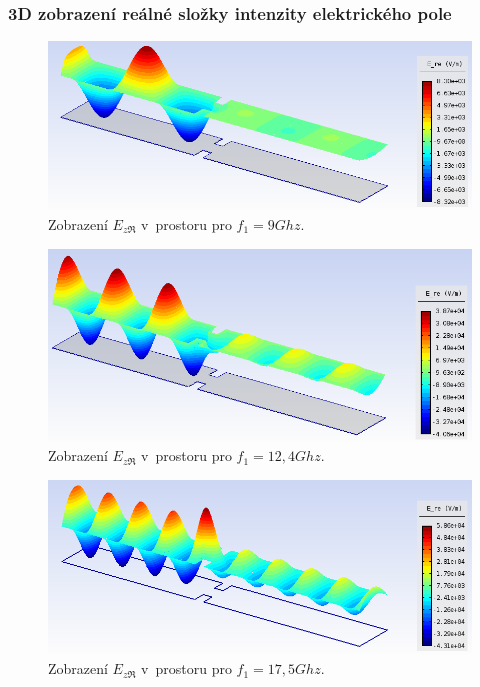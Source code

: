 \subsubsection*{3D zobrazení reálné složky intenzity elektrického pole}
\begin{figure}[!h]
	\centering
	\includegraphics[width=14cm]{priklad_R100narrow_Ere_9Ghz_3D.png}
	\caption{Zobrazení $E_{z\Re}$ v~prostoru pro $f_1 = 9\unit{Ghz}$.}
	\label{obr:priklad_R100narrow_Ere_9Ghz_3D}
\end{figure}
\begin{figure}[!h]
	\centering
	\includegraphics[width=14cm]{priklad_R100narrow_Ere_12Ghz_3D.png}
	\caption{Zobrazení $E_{z\Re}$ v~prostoru pro $f_1 = 12,4\unit{Ghz}$.}
	\label{obr:priklad_R100narrow_Ere_12Ghz_3D}
\end{figure}
\begin{figure}[!h]
	\centering
	\includegraphics[width=14cm]{priklad_R100narrow_Ere_17Ghz_3D.png}
	\caption{Zobrazení $E_{z\Re}$ v~prostoru pro $f_1 = 17,5\unit{Ghz}$.}
	\label{obr:priklad_R100narrow_Ere_17Ghz_3D}
\end{figure}